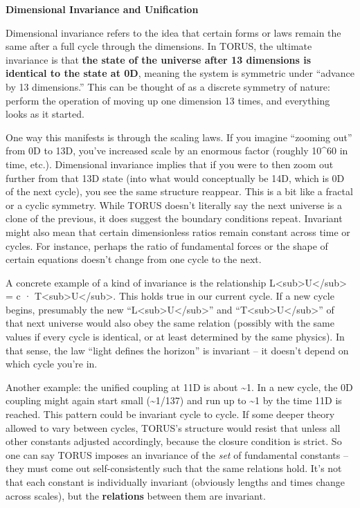 \documentclass[
]{article}
\begin{document}
\textbf{Dimensional Invariance and Unification}

Dimensional invariance refers to the idea that certain forms or laws
remain the same after a full cycle through the dimensions. In TORUS, the
ultimate invariance is that \textbf{the state of the universe after 13
dimensions is identical to the state at 0D}, meaning the system is
symmetric under ``advance by 13 dimensions.'' This can be thought of as
a discrete symmetry of nature: perform the operation of moving up one
dimension 13 times, and everything looks as it started\hspace{0pt}.

One way this manifests is through the scaling laws. If you imagine
``zooming out'' from 0D to 13D, you've increased scale by an enormous
factor (roughly 10\^{}60 in time, etc.). Dimensional invariance implies
that if you were to then zoom out further from that 13D state (into what
would conceptually be 14D, which is 0D of the next cycle), you see the
same structure reappear. This is a bit like a fractal or a cyclic
symmetry. While TORUS doesn't literally say the next universe is a clone
of the previous, it does suggest the boundary conditions repeat.
Invariant might also mean that certain dimensionless ratios remain
constant across time or cycles. For instance, perhaps the ratio of
fundamental forces or the shape of certain equations doesn't change from
one cycle to the next.

A concrete example of a kind of invariance is the relationship
L\textless sub\textgreater U\textless/sub\textgreater{} = c ·
T\textless sub\textgreater U\textless/sub\textgreater. This holds true
in our current cycle. If a new cycle begins, presumably the new
``L\textless sub\textgreater U\textless/sub\textgreater'' and
``T\textless sub\textgreater U\textless/sub\textgreater'' of that next
universe would also obey the same relation (possibly with the same
values if every cycle is identical, or at least determined by the same
physics). In that sense, the law ``light defines the horizon'' is
invariant -- it doesn't depend on which cycle you're in.

Another example: the unified coupling at 11D is about \textasciitilde1.
In a new cycle, the 0D coupling might again start small
(\textasciitilde1/137) and run up to \textasciitilde1 by the time 11D is
reached. This pattern could be invariant cycle to cycle. If some deeper
theory allowed \alpha to vary between cycles, TORUS's structure would resist
that unless all other constants adjusted accordingly, because the
closure condition is strict. So one can say TORUS imposes an invariance
of the \emph{set} of fundamental constants -- they must come out
self-consistently such that the same relations hold. It's not that each
constant is individually invariant (obviously lengths and times change
across scales), but the \textbf{relations} between them are invariant.
\end{document}
